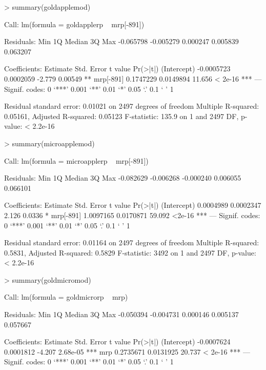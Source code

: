 \documentclass[12pt, a14paper, lithuanian]{article}
\begin{document}
\begin{Schunk}
\begin{Sinput}
> summary(goldapplemod)
\end{Sinput}
\begin{Soutput}
Call:
lm(formula = goldapplerp ~ mrp[-891])

Residuals:
      Min        1Q    Median        3Q       Max 
-0.065798 -0.005279  0.000247  0.005839  0.063207 

Coefficients:
              Estimate Std. Error t value Pr(>|t|)    
(Intercept) -0.0005723  0.0002059  -2.779  0.00549 ** 
mrp[-891]    0.1747229  0.0149894  11.656  < 2e-16 ***
---
Signif. codes:  0 ‘***’ 0.001 ‘**’ 0.01 ‘*’ 0.05 ‘.’ 0.1 ‘ ’ 1 

Residual standard error: 0.01021 on 2497 degrees of freedom
Multiple R-squared: 0.05161,	Adjusted R-squared: 0.05123 
F-statistic: 135.9 on 1 and 2497 DF,  p-value: < 2.2e-16 
\end{Soutput}
\begin{Sinput}
> summary(microapplemod)
\end{Sinput}
\begin{Soutput}
Call:
lm(formula = microapplerp ~ mrp[-891])

Residuals:
      Min        1Q    Median        3Q       Max 
-0.082629 -0.006268 -0.000240  0.006055  0.066101 

Coefficients:
             Estimate Std. Error t value Pr(>|t|)    
(Intercept) 0.0004989  0.0002347   2.126   0.0336 *  
mrp[-891]   1.0097165  0.0170871  59.092   <2e-16 ***
---
Signif. codes:  0 ‘***’ 0.001 ‘**’ 0.01 ‘*’ 0.05 ‘.’ 0.1 ‘ ’ 1 

Residual standard error: 0.01164 on 2497 degrees of freedom
Multiple R-squared: 0.5831,	Adjusted R-squared: 0.5829 
F-statistic:  3492 on 1 and 2497 DF,  p-value: < 2.2e-16 
\end{Soutput}
\begin{Sinput}
> summary(goldmicromod)
\end{Sinput}
\begin{Soutput}
Call:
lm(formula = goldmicrorp ~ mrp)

Residuals:
      Min        1Q    Median        3Q       Max 
-0.050394 -0.004731  0.000146  0.005137  0.057667 

Coefficients:
              Estimate Std. Error t value Pr(>|t|)    
(Intercept) -0.0007624  0.0001812  -4.207 2.68e-05 ***
mrp          0.2735671  0.0131925  20.737  < 2e-16 ***
---
Signif. codes:  0 ‘***’ 0.001 ‘**’ 0.01 ‘*’ 0.05 ‘.’ 0.1 ‘ ’ 1 


\end{Soutput}
\end{Schunk}
\end{document}
